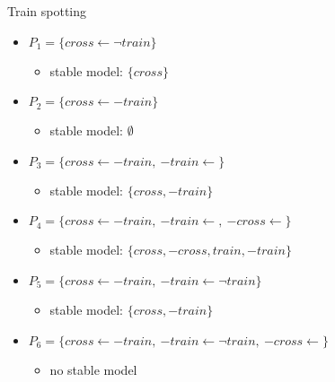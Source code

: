 \begin{frame}[c]{Train spotting}

\begin{itemize}\itemsep 5pt
\item<1-2,13>
  \(
  P_1=\{\mathit{cross}\leftarrow{\neg \mathit{train}}\}
  \)
  \begin{itemize}
  \item<2,13> stable model: $\{\mathit{cross}\}$
  \end{itemize}
\item<1,3-4,13>
  \(
  P_2=\{\mathit{cross}\leftarrow{-\mathit{train}}\}
  \)
  \begin{itemize}
  \item<4,13> stable model: $\emptyset$
  \end{itemize}
\item<1,5-6,13>
  \(
  P_3=\{\mathit{cross}\leftarrow{-\mathit{train}}, \
          {-\mathit{train}}\leftarrow\}
  \)
  \begin{itemize}
  \item<6,13> stable model: $\{\mathit{cross},{-\mathit{train}}\}$
  \end{itemize}
\item<1,7-8,13>
  \(
  P_4=\{\mathit{cross}\leftarrow{-\mathit{train}}, \
          {-\mathit{train}}\leftarrow, \
          {-\mathit{cross}}\leftarrow\}
  \)
  \begin{itemize}
  \item<8,13> stable model: $\{\mathit{cross},{-\mathit{cross}},\mathit{train},{-\mathit{train}}\}$
  \end{itemize}
\item<1,9-10,13>
  \(
  P_5=\{\mathit{cross}\leftarrow{-\mathit{train}}, \
          {-\mathit{train}}\leftarrow{\neg \mathit{train}}\}
  \)
  \begin{itemize}
  \item<10,13> stable model: $\{\mathit{cross},{-\mathit{train}}\}$
  \end{itemize}
\item<1,11-12,13>
  \(
  P_6=\{\mathit{cross}\leftarrow{-\mathit{train}}, \
          {-\mathit{train}}\leftarrow{\neg \mathit{train}}, \
          {-\mathit{cross}}\leftarrow\}
  \)
  \begin{itemize}
  \item<12,13> no stable model
  \end{itemize}
\end{itemize}

\end{frame}

